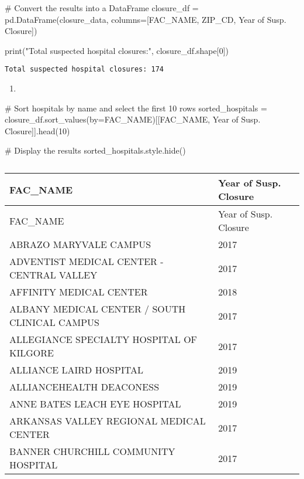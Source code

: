 \documentclass[
  letterpaper,
  DIV=11,
  numbers=noendperiod]{scrartcl}
\newenvironment{Shaded}{\begin{snugshade}}{\end{snugshade}}
\newcommand{\BuiltInTok}[1]{\textcolor[rgb]{0.00,0.23,0.31}{#1}}
\newcommand{\CommentTok}[1]{\textcolor[rgb]{0.37,0.37,0.37}{#1}}
\newcommand{\DecValTok}[1]{\textcolor[rgb]{0.68,0.00,0.00}{#1}}
\newcommand{\NormalTok}[1]{\textcolor[rgb]{0.00,0.23,0.31}{#1}}
\newcommand{\OperatorTok}[1]{\textcolor[rgb]{0.37,0.37,0.37}{#1}}
\newcommand{\StringTok}[1]{\textcolor[rgb]{0.13,0.47,0.30}{#1}}
\providecommand{\tightlist}{%
  \setlength{\itemsep}{0pt}\setlength{\parskip}{0pt}}\usepackage{longtable,booktabs,array}
\begin{document}
\begin{Shaded}
\begin{Highlighting}[]
\CommentTok{\# Convert the results into a DataFrame}
\NormalTok{closure\_df }\OperatorTok{=}\NormalTok{ pd.DataFrame(closure\_data, columns}\OperatorTok{=}\NormalTok{[}\StringTok{\textquotesingle{}FAC\_NAME\textquotesingle{}}\NormalTok{, }\StringTok{\textquotesingle{}ZIP\_CD\textquotesingle{}}\NormalTok{, }\StringTok{\textquotesingle{}Year of Susp. Closure\textquotesingle{}}\NormalTok{])}

\BuiltInTok{print}\NormalTok{(}\StringTok{"Total suspected hospital closures:"}\NormalTok{, closure\_df.shape[}\DecValTok{0}\NormalTok{])}
\end{Highlighting}
\end{Shaded}

\begin{verbatim}
Total suspected hospital closures: 174
\end{verbatim}

\begin{enumerate}
\def\labelenumi{\arabic{enumi}.}
\setcounter{enumi}{1}
\tightlist
\item
\end{enumerate}

\begin{Shaded}
\begin{Highlighting}[]
\CommentTok{\# Sort hospitals by name and select the first 10 rows}
\NormalTok{sorted\_hospitals }\OperatorTok{=}\NormalTok{ closure\_df.sort\_values(by}\OperatorTok{=}\StringTok{\textquotesingle{}FAC\_NAME\textquotesingle{}}\NormalTok{)[[}\StringTok{\textquotesingle{}FAC\_NAME\textquotesingle{}}\NormalTok{, }\StringTok{\textquotesingle{}Year of Susp. Closure\textquotesingle{}}\NormalTok{]].head(}\DecValTok{10}\NormalTok{)}

\CommentTok{\# Display the results}
\NormalTok{sorted\_hospitals.style.hide()}
\end{Highlighting}
\end{Shaded}

\begin{longtable}[]{@{}ll@{}}
\caption{}\label{T_13f8e}\tabularnewline
\toprule\noalign{}
FAC\_NAME & Year of Susp. Closure \\
\midrule\noalign{}
\endfirsthead
\toprule\noalign{}
FAC\_NAME & Year of Susp. Closure \\
\midrule\noalign{}
\endhead
\bottomrule\noalign{}
\endlastfoot
ABRAZO MARYVALE CAMPUS & 2017 \\
ADVENTIST MEDICAL CENTER - CENTRAL VALLEY & 2017 \\
AFFINITY MEDICAL CENTER & 2018 \\
ALBANY MEDICAL CENTER / SOUTH CLINICAL CAMPUS & 2017 \\
ALLEGIANCE SPECIALTY HOSPITAL OF KILGORE & 2017 \\
ALLIANCE LAIRD HOSPITAL & 2019 \\
ALLIANCEHEALTH DEACONESS & 2019 \\
ANNE BATES LEACH EYE HOSPITAL & 2019 \\
ARKANSAS VALLEY REGIONAL MEDICAL CENTER & 2017 \\
BANNER CHURCHILL COMMUNITY HOSPITAL & 2017 \\
\end{longtable}
\end{document}
